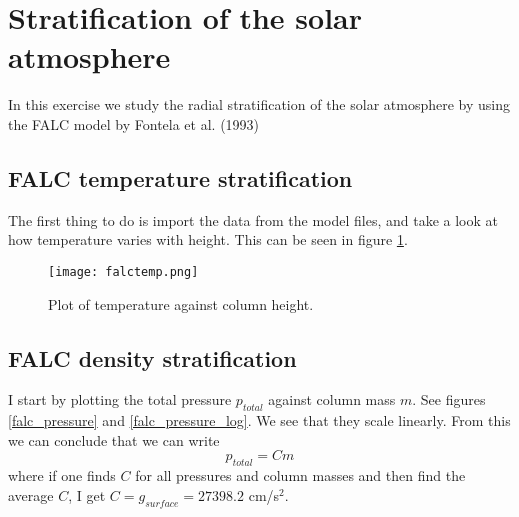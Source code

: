 \documentclass{aa}   %
\begin{document}
  


\section{Stratification of the solar atmosphere}
In this exercise we study the radial stratification of the solar atmosphere by using the FALC model by Fontela et al. (1993)

\subsection{FALC temperature stratification}
The first thing to do is import the data from the model files, and take a look at how temperature varies with height.
This can be seen in figure \ref{falctemp}.
 \begin{figure}
  \texttt{[image: falctemp.png]}
  \caption{Plot of temperature against column height.}
  \label{falctemp} 
 \end{figure}


\subsection{FALC density stratification}
I start by plotting the total pressure $p_{total}$ against column mass $m$. See figures \ref{falc_pressure} and \ref{falc_pressure_log}.
We see that they scale linearly. From this we can conclude that we can write 
\begin{equation}
 p_{total} = Cm
\end{equation}
where if one finds $C$ for all pressures and column masses and then find the average $C$, I get $C = g_{surface} = 27398.2$ cm/s$^2$.
\end{document}
